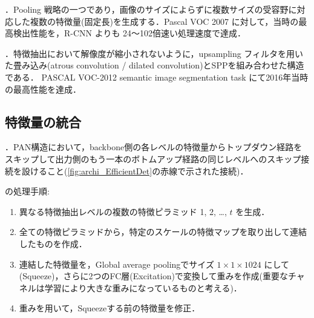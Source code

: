 \documentclass[originalpaper,fleqn]{jsaiart}     %
\begin{document}
\cite{HZRS15,HZRS14}．Pooling 戦略の一つであり，画像のサイズによらずに複数サイズの受容野に対応した複数の特徴量(固定長)を生成する．Pascal VOC 2007 に対して，当時の最高検出性能を，R-CNN よりも 24〜102倍速い処理速度で達成．

\cite{CPKMY17}．特徴抽出において解像度が縮小されないように，upsampling フィルタを用いた畳み込み(atrous convolution / dilated convolution)とSPPを組み合わせた構造である．
PASCAL VOC-2012 semantic image segmentation task にて2016年当時の最高性能を達成．

\subsection{特徴量の統合}
 \cite{TPL20}．PAN構造において，backbone側の各レベルの特徴量からトップダウン経路をスキップして出力側のもう一本のボトムアップ経路の同じレベルへのスキップ接続を設けること(\ref{fig:archi_EfficientDet}の赤線で示された接続)．

 \cite{ZSWTCCL19} の処理手順:
\begin{enumerate}
    \item 異なる特徴抽出レベルの複数の特徴ピラミッド 1, 2, …, $t$ を生成．
    \item 全ての特徴ピラミッドから，特定のスケールの特徴マップを取り出して連結したものを作成．
    \item 連結した特徴量を，Global average poolingでサイズ $1{\times}1{\times}1024$ にして(Squeeze)，さらに2つのFC層(Excitation)で変換して重みを作成(重要なチャネルは学習により大きな重みになっているものと考える)．
    \item 重みを用いて，Squeezeする前の特徴量を修正．
\end{enumerate}
\end{document}

